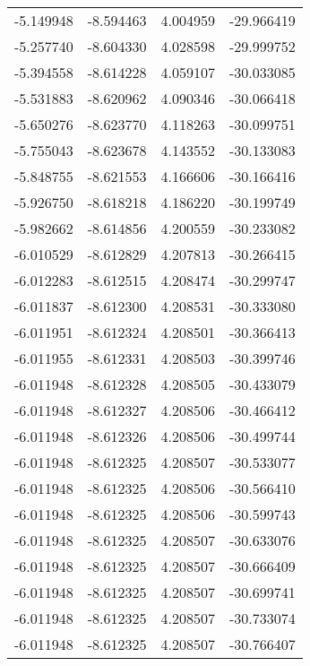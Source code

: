 \begin{tabular}{rrrr}
       -5.149948 &        -8.594463 &    4.004959 & -29.966419 \\
       -5.257740 &        -8.604330 &    4.028598 & -29.999752 \\
       -5.394558 &        -8.614228 &    4.059107 & -30.033085 \\
       -5.531883 &        -8.620962 &    4.090346 & -30.066418 \\
       -5.650276 &        -8.623770 &    4.118263 & -30.099751 \\
       -5.755043 &        -8.623678 &    4.143552 & -30.133083 \\
       -5.848755 &        -8.621553 &    4.166606 & -30.166416 \\
       -5.926750 &        -8.618218 &    4.186220 & -30.199749 \\
       -5.982662 &        -8.614856 &    4.200559 & -30.233082 \\
       -6.010529 &        -8.612829 &    4.207813 & -30.266415 \\
       -6.012283 &        -8.612515 &    4.208474 & -30.299747 \\
       -6.011837 &        -8.612300 &    4.208531 & -30.333080 \\
       -6.011951 &        -8.612324 &    4.208501 & -30.366413 \\
       -6.011955 &        -8.612331 &    4.208503 & -30.399746 \\
       -6.011948 &        -8.612328 &    4.208505 & -30.433079 \\
       -6.011948 &        -8.612327 &    4.208506 & -30.466412 \\
       -6.011948 &        -8.612326 &    4.208506 & -30.499744 \\
       -6.011948 &        -8.612325 &    4.208507 & -30.533077 \\
       -6.011948 &        -8.612325 &    4.208506 & -30.566410 \\
       -6.011948 &        -8.612325 &    4.208506 & -30.599743 \\
       -6.011948 &        -8.612325 &    4.208507 & -30.633076 \\
       -6.011948 &        -8.612325 &    4.208507 & -30.666409 \\
       -6.011948 &        -8.612325 &    4.208507 & -30.699741 \\
       -6.011948 &        -8.612325 &    4.208507 & -30.733074 \\
       -6.011948 &        -8.612325 &    4.208507 & -30.766407 \\

\end{tabular}
